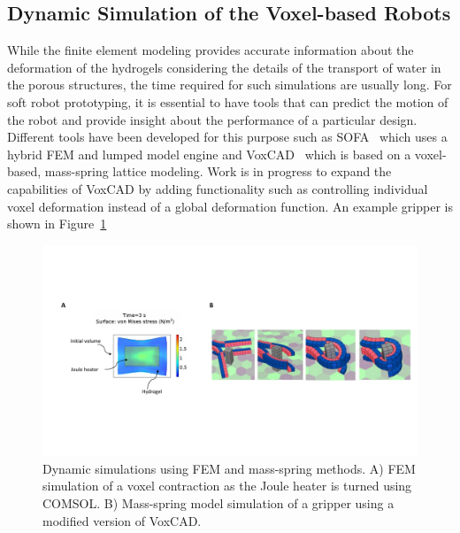 \subsection{Dynamic Simulation of the Voxel-based Robots}
While the finite element modeling provides accurate information about the deformation of the hydrogels considering the details of the transport of water in the porous structures, the time required for such simulations are usually long. For soft robot prototyping, it is essential to have tools that can predict the motion of the robot and provide insight about the performance of a particular design. Different tools have been developed for this purpose such as SOFA~\cite{Faure2012} which uses a hybrid FEM and lumped model engine and VoxCAD~\cite{Hiller2014} which is based on a voxel-based, mass-spring lattice modeling. Work is in progress to expand the capabilities of VoxCAD by adding functionality such as controlling individual voxel deformation instead of a global deformation function. An example gripper is shown in Figure~\ref{fig:voxcad}
\begin{figure}[!t]
\centering
\includegraphics[width=\textwidth]{voxcad.pdf}
    \caption[]{Dynamic simulations using FEM and mass-spring methods. A) FEM simulation of a voxel contraction as the Joule heater is turned using COMSOL. B) Mass-spring model simulation of a gripper using a modified version of VoxCAD. }
    \label{fig:voxcad}
\end{figure}

